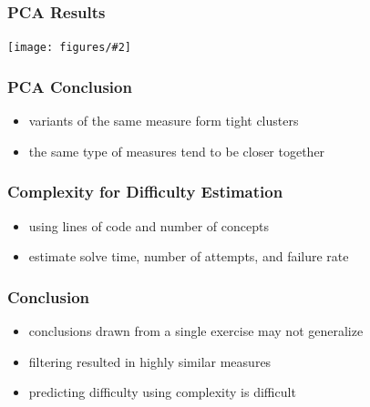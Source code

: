 \documentclass[bigger]{beamer}
\newcommand{\img}[2]{
  \begin{center}
    \texttt{[image: figures/\#2]}
  \end{center}
}
\begin{document}
\begin{frame}
\frametitle{PCA Results}
\img{1}{pca}
\end{frame}

\begin{frame}
\frametitle{PCA Conclusion}
\begin{itemize}
    \item variants of the same measure form tight clusters
    \item the same type of measures tend to be closer together
\end{itemize}
\end{frame}

\begin{frame}
\frametitle{Complexity for Difficulty Estimation}
\begin{itemize}
    \item using lines of code and number of concepts
    \item estimate solve time, number of attempts, and failure rate
\end{itemize}
\end{frame}

\begin{frame}
\frametitle{Conclusion}
\begin{itemize}
    \item conclusions drawn from a single exercise may not generalize
    \item filtering resulted in highly similar measures
    \item predicting difficulty using complexity is difficult
\end{itemize}
\end{frame}
\end{document}

